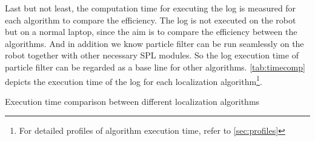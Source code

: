 Last but not least, the computation time for executing the log is measured for each algorithm to compare the efficiency.  The log is not executed on the robot but on a normal laptop, since the aim is to compare the efficiency between the algorithms. And in addition we know particle filter can be run seamlessly on the robot together with other necessary \gls{SPL} modules. So the log execution time of particle filter can be regarded as a base line for other algorithms. \autoref{tab:timecomp} depicts the execution time of the log for each localization algorithm\footnote{For detailed profiles of algorithm execution time, refer to \autoref{sec:profiles}}. 



\begin{table}[h!]
\centering
\caption{Execution time comparison between different localization algorithms}
\label{tab:timecomp}
\end{table}
